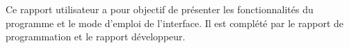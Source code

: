 \documentclass{themeensg}
\begin{document}
Ce rapport utilisateur a pour objectif de présenter les fonctionnalités du programme et le mode d'emploi de l'interface. Il est complété par le rapport de programmation et le rapport développeur.\\







\newpage
\listoffigures

\end{document}
